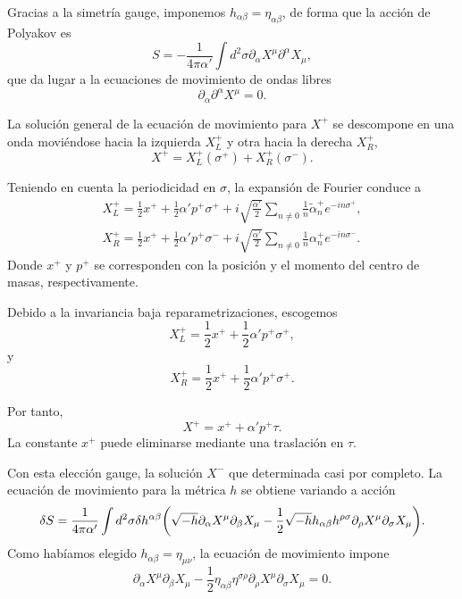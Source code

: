 Gracias a la simetría gauge, imponemos $h_{\alpha\beta}=\eta_{\alpha\beta}$, de forma que 
la acción de Polyakov es
\begin{equation}
  S = -\frac{1}{4\pi\alpha'} \int d^2\sigma \partial_\alpha X^\mu \partial^\alpha X_\mu,
\end{equation}
que da lugar a la ecuaciones de movimiento de ondas libres
\begin{equation}
  \partial_\alpha \partial^\alpha X^\mu=0.
\end{equation}

La solución general de la ecuación de movimiento para $X^+$ se descompone
en una onda moviéndose hacia la izquierda $X^+_L$ y otra hacia la derecha $X^+_R$,
\begin{equation}
   X^+ =X^+_L(\sigma^+) + X^+_R(\sigma^-).
\end{equation}

Teniendo en cuenta la periodicidad en $\sigma$, la expansión de Fourier conduce a
\begin{equation}
  \begin{gathered}
    X^+_L=\frac 1 2 x^+ + \frac 1 2 \alpha' p^+ \sigma^+ + i\sqrt{\frac{\alpha'}{2}}\sum_{n\neq 0} \frac{1}{n}\tilde \alpha^+_n e^{-in\sigma^+},\\
    X^+_R=\frac 1 2 x^+ + \frac 1 2 \alpha' p^+ \sigma^- +i\sqrt{\frac{\alpha'}{2}}\sum_{n\neq 0} \frac{1}{n}\alpha^+_n e^{-in\sigma^-}.
  \end{gathered}
\end{equation}
Donde $x^+$ y $p^+$ se corresponden con la posición y el momento del centro de masas, respectivamente.


Debido a la invariancia baja reparametrizaciones, escogemos
\begin{equation}
  X^+_L=\frac 1 2 x^+ + \frac 1 2 \alpha' p^+ \sigma^+,
\end{equation}
y
\begin{equation}
  X^+_R=\frac 1 2 x^+ + \frac 1 2 \alpha' p^+ \sigma^+.
\end{equation}

Por tanto, 
\begin{equation}
  X^+ = x^+ + \alpha' p^+ \tau.
\end{equation}
La constante $x^+$ puede eliminarse mediante una traslación en $\tau$.

Con esta elección gauge, la solución $X^-$ que determinada casi por completo.
La ecuación de movimiento para la métrica $h$ se obtiene variando a acción
\begin{equation}
  \delta S = \frac{1}{4\pi\alpha'}\int d^2\sigma \delta h^{\alpha\beta}
  \qty(
  \sqrt{-h}\partial_\alpha X^\mu \partial_\beta X_\mu -
  \frac 1 2 \sqrt{-h}h_{\alpha\beta}h^{\rho\sigma} \partial_\rho X^\mu \partial_\sigma X_\mu).
\end{equation}
Como habíamos elegido $h_{\alpha\beta}=\eta_{\mu\nu}$, la ecuación de movimiento impone
\begin{equation}
  \partial_\alpha X^\mu \partial_\beta X_\mu - \frac 1 2 \eta_{\alpha\beta} \eta^{\sigma\rho} 
  \partial_\rho X^\mu  \partial_\sigma X_\mu = 0.
\end{equation}

